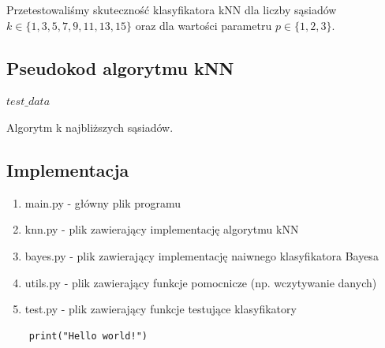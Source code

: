 \documentclass[12pt,a4paper]{article}
\begin{document}
\noindent Przetestowaliśmy skuteczność klasyfikatora kNN dla liczby sąsiadów $k \in \{1, 3, 5, 7, 9, 11, 13, 15\}$ oraz
dla wartości parametru $p \in \{1, 2, 3\}$.

\subsection{Pseudokod algorytmu kNN}
\begin{algorithm}[H]
	\Return $test\_data$\;
	\caption{Algorytm k najbliższych sąsiadów.}
\end{algorithm}

\subsection{Implementacja}
\begin{enumerate}
	\item main.py - główny plik programu
	\item knn.py - plik zawierający implementację algorytmu kNN
	\item bayes.py - plik zawierający implementację naiwnego klasyfikatora Bayesa
	\item utils.py - plik zawierający funkcje pomocnicze (np. wczytywanie danych)
	\item test.py - plik zawierający funkcje testujące klasyfikatory
\end{enumerate}
\begin{lstlisting}
	print("Hello world!")
\end{lstlisting}
\end{document}

